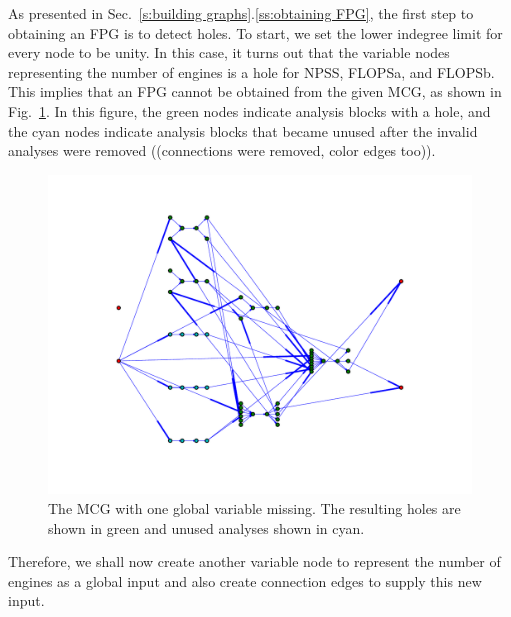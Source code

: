 	As presented in Sec.~\ref{s:building graphs}.\ref{ss:obtaining FPG}, the first step to obtaining an FPG is to detect holes. 
	To start, we set the lower indegree limit for every node to be unity. 
	In this case, it turns out that the variable nodes representing the number of engines is a hole for NPSS, FLOPSa, and FLOPSb. 
	This implies that an FPG cannot be obtained from the given MCG, as shown in Fig.~\ref{f:MCG nengines}. 
	In this figure, the green nodes indicate analysis blocks with a hole, and the cyan nodes indicate analysis blocks that became unused after the invalid analyses were removed ((connections were removed, color edges too)).
	\begin{figure}[htb!]
	  \begin{center}
		\includegraphics[width=.6\textwidth]{images/MCG_nengines}
	  \end{center}
	  \caption{The MCG with one global variable missing. The resulting holes are shown in green and unused analyses shown in cyan.}
	\label{f:MCG nengines}
	\end{figure}
	Therefore, we shall now create another variable node to represent the number of engines as a global input and also create connection edges to supply this new input. 

